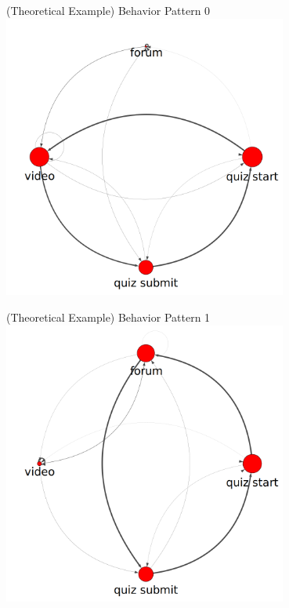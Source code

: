\documentclass[10pt]{beamer}
\begin{document}
\begin{frame}{(Theoretical Example) Behavior Pattern 0}
  \centering
  \includegraphics[width=0.7\textwidth]{../figures/example/state0.png}
\end{frame}

\begin{frame}{(Theoretical Example) Behavior Pattern 1}
  \centering
  \includegraphics[width=0.7\textwidth]{../figures/example/state1.png}
\end{frame}
\end{document}
